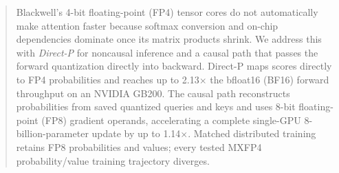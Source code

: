 \begin{abstract}
Blackwell's 4-bit floating-point (FP4) tensor cores do not automatically make
attention faster because softmax conversion and on-chip dependencies dominate
once its matrix products shrink.  We address this with \emph{Direct-P} for
noncausal inference and a causal path that passes the forward quantization
directly into backward.
Direct-P maps scores directly to FP4 probabilities and reaches up to
2.13$\times$ the bfloat16 (BF16) forward throughput on an NVIDIA GB200.
The causal path reconstructs probabilities from saved quantized queries and
keys and uses 8-bit floating-point (FP8) gradient operands, accelerating a
complete single-GPU 8-billion-parameter update by up to 1.14$\times$.
Matched distributed training retains FP8 probabilities and values; every
tested MXFP4 probability/value training trajectory diverges.
\end{abstract}
